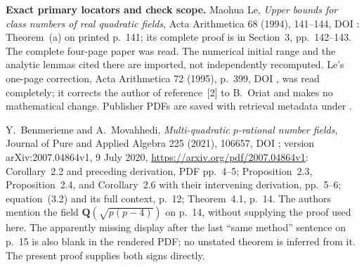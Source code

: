 \documentclass[11pt,a4paper]{article}
\theoremstyle{definition}
\renewcommand{\paragraph}[1]{\par\smallskip\noindent\textbf{#1}\quad\ignorespaces}
\begin{document}
\paragraph{Exact primary locators and check scope.}
Maohua Le, \emph{Upper bounds for class numbers of real quadratic
fields}, Acta Arithmetica 68 (1994), 141--144,
DOI : Theorem~(a) on printed
p.~141; its complete proof is in Section~3, pp.~142--143.
The complete four-page paper was read.  The numerical initial
range and the analytic lemmas cited there are imported, not
independently recomputed.  Le's one-page correction, Acta
Arithmetica 72 (1995), p.~399,
DOI , was read completely; it corrects
the author of reference~[2] to B.~Oriat and makes no mathematical
change.  Publisher PDFs are saved with retrieval metadata under
.

Y.~Benmerieme and A.~Movahhedi, \emph{Multi-quadratic $p$-rational
number fields}, Journal of Pure and Applied Algebra 225 (2021),
106657, DOI ; version
arXiv:2007.04864v1, 9 July 2020,
\url{https://arxiv.org/pdf/2007.04864v1}:
Corollary~2.2 and preceding derivation, PDF pp.~4--5;
Proposition~2.3, Proposition~2.4, and Corollary~2.6 with their
intervening derivation, pp.~5--6; equation~(3.2) and its full
context, p.~12; Theorem~4.1, p.~14.
The authors mention the field $\mathbf Q(\sqrt{p(p-4)})$ on
p.~14, without supplying the proof used here.  The apparently
missing display after the last ``same method'' sentence on p.~15
is also blank in the rendered PDF; no unstated theorem is inferred
from it.  The present proof supplies both signs directly.

\end{document}
